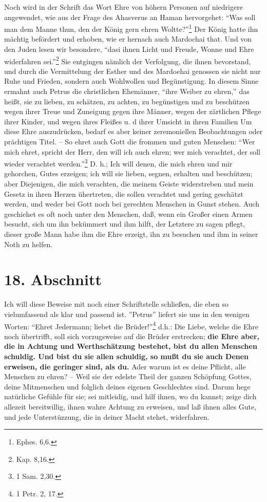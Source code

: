 Noch wird in der Schrift das Wort Ehre von höhern Personen auf niedrigere
angewendet, wie aus der Frage des Ahasverus an Haman hervorgehet: "`Was soll man
dem Manne thun, den der König gern ehren Woltte?"'\footnote{Ephes. 6,6.} Der
König hatte ihn mächtig befördert und erhoben, wie er hernach auch Mardochai
that. Und von den Juden lesen wir besondere, "`dasi ihnen Licht und Freude,
Wonne und Ehre widerfahren sei."'\footnote{Kap. 8,16.} Sie entgingen nämlich der
Verfolgung, die ihnen bevorstand, und durch die Vermittelung der Esther und des
Mardoehai genossen sie nicht nur Ruhe und Frieden, sondern auch Wohlwollen und
Begünstigung. In diesem Sinne ermahnt auch Petrus die christlichen Ehemänner,
"`ihre Weiber zu ehren,"' das heißt, sie zu lieben, zu schätzen, zu achten, zu
begünstigen und zu beschützen wegen ihrer Treue und Zuneigung gegen ihre Männer,
wegen der zärtlichen Pflege ihrer Kinder, und wegen ihres Fleißes u. d ihrer
Umsicht in ihren Familien Um diese Ehre auszudrücken, bedarf es aber keiner
zeremoniellen Beobachtungen oder prächtigen Titel. -- So ehret auch Gott die
frommen und guten Menschen: "`Wer mich ehret, spricht der Herr, den will ich
auch ehren; wer mich verachtet, der soll wieder verachtet werden."'\footnote{1
Sam. 2,30.} D. h.; Ich will denen, die mich ehren und mir gehorchen, Gutes
erzeigen; ich will sie lieben, segnen, erhalten und beschützen; aber Diejenigen,
die mich verachten, die meinem Geiste widerstreben und mein Gesetz in ihren
Herzen ühertreten, die sollen verachtet und gering geschätzt werden, und weder
bei Gott noch bei gerechten Menschen in Gunst stehen. Auch geschiehet es oft
noch unter den Menschen, daß, wenn ein Großer einen Armen besucht, sich um ihn
bekümmert und ihm hilft, der Letztere zu sagen pflegt, dieser große Mann habe
ihm die Ehre erzeigt, ihn zu besuchen und ihm in seiner Noth zu helfen.

\section{18. Abschnitt} \label{kap9_ab18}

Ich will diese Beweise mit noch einer Schriftstelle schließen, die eben so
vielumfassend als klar und passend ist. ''Petrus'' liefert sie uns in den
wenigen Worten: "`Ehret Jedermann; liebet die Brüder!"'\footnote{1 Petr. 2, 17.}
d.h.: Die Liebe, welche die Ehre noch übertrifft, soll sich vorzugsweise auf die
Brüder erstrecken; \textbf{die Ehre aber, die in Achtung und Werthschätzung bestehet,
bist du allen Menschen schuldig. Und bist du sie allen schuldig, so mußt du sie
auch Denen erweisen, die geringer sind, als du.} Ader warum ist es deine Pflicht,
alle Menschen zu ehren? -- Weil sie der edelste Theil der ganzen Schöpfung
Gottes, deine Mitmenschen und folglich deines eigenen Geschlechtes sind. Darum
hege natürliche Gefühle für sie; sei mitleidig, und hilf ihnen, wo du kannst;
zeige dich allezeit bereitwillig, ihnen wahre Achtung zu erweisen, und laß ihnen
alles Gute, und jede Unterstüzzung, die in deiner Macht stehet, widerfahren.


